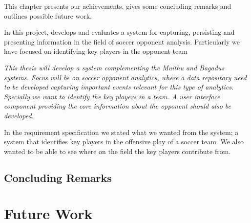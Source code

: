 This chapter presents our achievements, gives some concluding remarks and outlines possible future work.

In this project, develops and evaluates a system for capturing, persisting and presenting information in the field of soccer opponent analysis. Particularly we have focused on identifying key players in the opponent team 

\textit{This thesis will develop a system complementing the Muithu and Bagadus systems. Focus will be on soccer opponent analytics, where a data repository need to be developed capturing important events relevant for this type of analytics. Specially we want to identify the key players in a team. A user interface component providing the core information about the opponent should also be developed.}

In the requirement specification we stated what we wanted from the system; a system that identifies key players in the offensive play of a soccer team. We also wanted to be able to see where on the field the key players contribute from.

\subsection{Concluding Remarks}



\section{Future Work}


